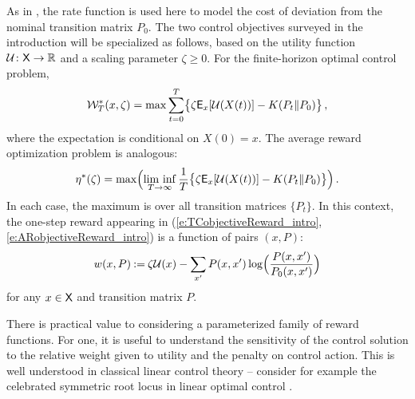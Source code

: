 \documentclass[final,12pt]{colt2018} %
\def\util{{\mathcal{U}}}
\def\reward{w}
\def\liminf{\mathop{\rm lim\ inf}}
\def\state{{\sf X}}
\newcommand{\field}[1]{\mathbb{#1}}
\def\Re{\field{R}}
\def\clW{{\cal W}}
\def\eqdef{\mathbin{:=}}
\def\Expect{{\sf E}}
\def\Re{\field{R}}
\begin{document}



    



As in \cite{tod07,guaragwil14,meybarbusyueehr15}, the rate function is used here 
to model the cost of deviation from the nominal transition matrix $P_0$. 
The two control objectives surveyed in the introduction will be specialized as follows, based on the utility function    $\util\colon\state\to\Re$ and a scaling parameter $\zeta\ge 0$.
For  the finite-horizon optimal control problem,  
\begin{equation}
\clW^*_T(x,\zeta) = \max \sum_{t=0}^T \bigl\{\zeta \Expect_x[ \util(X(t))  ]  -  K(P_t\| P_0)  \bigr\}\,, 
\label{e:TCobjectiveReward}
\end{equation}
where   %
the expectation is conditional on $X(0)=x$. The average reward optimization problem is analogous:
\begin{equation} 
\eta^*(\zeta) =\max\Bigl( \liminf_{T\to\infty}\frac{1}{T}  \bigl\{ \zeta\Expect_x[ \util(X(t))  ]  -  K(P_t\| P_0)  \bigr\} \Bigr)\,.
\label{e:ARobjectiveReward_def}
\end{equation}
In each case, the  maximum is over all transition matrices $\{P_t\}$. 
In this context, the one-step reward   appearing in (\ref{e:TCobjectiveReward_intro}, \ref{e:ARobjectiveReward_intro}) is a function of pairs $(x,P)$:
\begin{equation}  
 \reward(x,P)  \eqdef \zeta \util(x) -    \sum_{x'}  P(x,x') \log \Bigl(\frac{P(x,x') }{P_0(x,x')} \Bigr)   
\label{e:cKLa}
\end{equation}
for any $x\in\state$  and transition matrix $P$.

There is practical value to considering a parameterized family of reward functions.  For one, it is useful to understand the sensitivity of the control solution to the relative weight given to utility    and the penalty on control action.   This is well understood in classical linear control theory -- consider for example the celebrated symmetric root locus in linear optimal control \cite{fraworpow97}.
\end{document}
